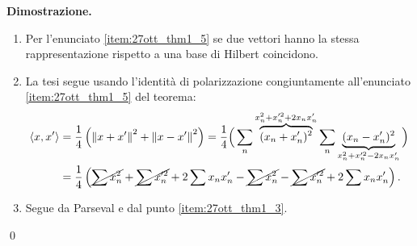 \vs 

\textbf{Dimostrazione.}

\begin{enumerate}
\item Per l'enunciato \ref{item:27ott_thm1_5} se due vettori hanno la stessa rappresentazione rispetto a una base di Hilbert coincidono.

\item La tesi segue usando l'identità di polarizzazione congiuntamente all'enunciato \ref{item:27ott_thm1_5} del teorema:
%
\begin{align*}
\left<x,x' \right> & = \frac{1}{4} \left( \left\lVert x + x' \right\rVert^2 + \left\lVert x - x' \right\rVert^2 \right)
= \frac{1}{4} \Big( \sum_n \overbrace{(x_n + x_n')^2}^{x_n^2 + x_n'^2 + 2x_n x_n'}  \sum_n \underbrace{(x_n - x_n')^2}_{x_n^2 + x_n'^2 - 2 x_n x_n'}  \Big) \\
& = \frac{1}{4} \left( \cancel{\sum x_n^2} + \cancel{\sum x_n'^2} + 2 \sum x_n x_n' - \cancel{\sum x_n^2} - \cancel{\sum x_n'^2} + 2 \sum x_n x_n' \right).
\end{align*}

\item Segue da Parseval e dal punto \ref{item:27ott_thm1_3}.

\end{enumerate}
\qed

